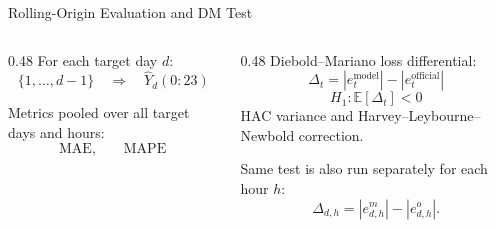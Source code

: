 \documentclass[10pt,aspectratio=169]{beamer}
\begin{document}
\begin{frame}{Rolling-Origin Evaluation and DM Test}
  \begin{columns}[T,onlytextwidth]
    \begin{column}{0.48\textwidth}
      \small
      For each target day $d$:
      \[
        \{1,\ldots,d-1\}
        \quad\Longrightarrow\quad
        \hat{Y}_d(0{:}23)
      \]

      \vspace{0.6em}
      Metrics pooled over all target days and hours:
      \[
        \text{MAE},\qquad \text{MAPE}
      \]
    \end{column}
    \begin{column}{0.48\textwidth}
      \small
      Diebold--Mariano loss differential:
      \[
        \Delta_t =
        |e_t^{\text{model}}|-|e_t^{\text{official}}|
      \]
      \[
        H_1:\mathbb{E}[\Delta_t] < 0
      \]
      HAC variance and Harvey--Leybourne--Newbold correction.

      \vspace{0.4em}
      Same test is also run separately for each hour $h$:
      \[
        \Delta_{d,h}=|e_{d,h}^{m}|-|e_{d,h}^{o}|.
      \]
    \end{column}
  \end{columns}
\end{frame}
\end{document}
